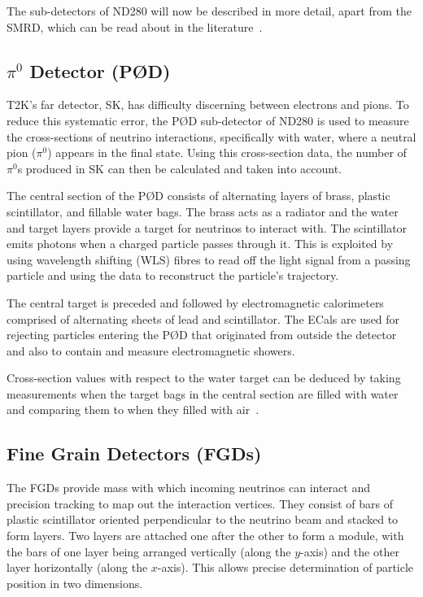 \documentclass[aps,pra,12pt,notitlepage,tightenlines]{revtex4-1}
\begin{document}
The sub-detectors of ND280 will now be described in more detail, apart from the SMRD, which can be read about in the literature~\cite{Aoki2013}.

\subsection{$\pi^0$ Detector (P\O D)}
T2K's far detector, SK, has difficulty discerning between electrons and pions. To reduce this systematic error, the P\O D sub-detector of ND280 is used to measure the cross-sections of neutrino interactions, specifically with water, where a neutral pion ($\pi^0$) appears in the final state. Using this cross-section data, the number of $\pi^0$s produced in SK can then be calculated and taken into account.

The central section of the P\O D consists of alternating layers of brass, plastic scintillator, and fillable water bags. The brass acts as a radiator and the water and target layers provide a target for neutrinos to interact with. The scintillator emits photons when a charged particle passes through it. This is exploited by using wavelength shifting (WLS) fibres to read off the light signal from a passing particle and using the data to reconstruct the particle's trajectory. 

The central target is preceded and followed by electromagnetic calorimeters comprised of alternating sheets of lead and scintillator. The ECals are used for rejecting particles entering the P\O D that originated from outside the detector and also to contain and measure electromagnetic showers. 

Cross-section values with respect to the water target can be deduced by taking measurements when the target bags in the central section are filled with water and comparing them to when they filled with air~\cite{ABE2011106, Assylbekov:2011sh}.

\subsection{Fine Grain Detectors (FGDs)}
The FGDs provide mass with which incoming neutrinos can interact and precision tracking to map out the interaction vertices. They consist of bars of plastic scintillator oriented perpendicular to the neutrino beam and stacked to form layers. Two layers are attached one after the other to form a module, with the bars of one layer being arranged vertically (along the $y$-axis) and the other layer horizontally (along the $x$-axis). This allows precise determination of particle position in two dimensions.
\end{document}
